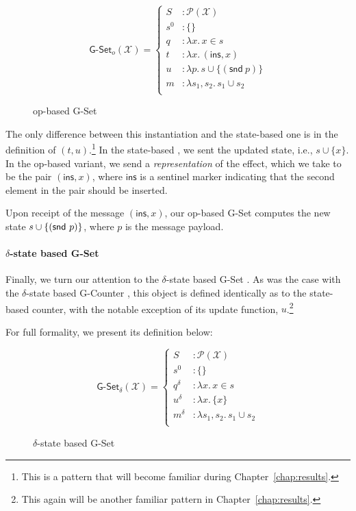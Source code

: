 \begin{figure}[H]
  \centering
  \[
    \textsf{G-Set}_o(\mathcal{X}) = \left\{\begin{aligned}
      S &: \mathcal{P}(\mathcal{X}) \\
      s^0 &: \{ \} \\
      q &: \lambda x.\, x \in s \\
      t &: \lambda x.\, (\textsf{ins}, x) \\
      u &: \lambda p.\, s \cup \{(\textsf{snd}~p)\} \\
      m &: \lambda s_1, s_2.\, s_1 \cup s_2 \\
    \end{aligned}\right.
  \]
  \caption{op-based \textsf{G-Set} \CRDT}
\end{figure}

The only difference between this \CRDT instantiation and the state-based one is
in the definition of $(t,u)$.\footnote{This is a pattern that will become
familiar during Chapter~\ref{chap:results}.} In the state-based \CRDT, we sent
the updated state, i.e., $s \cup \{ x \}$. In the op-based variant, we send a
\emph{representation} of the effect, which we take to be the pair
$(\textsf{ins}, x)$, where $\textsf{ins}$ is a sentinel marker indicating that
the second element in the pair should be inserted.

Upon receipt of the message $(\textsf{ins}, x)$, our op-based G-Set \CRDT
computes the new state $s \cup \{ (\textsf{snd}~p) \}$, where $p$ is the message
payload.

\paragraph{$\delta$-state based G-Set}
Finally, we turn our attention to the $\delta$-state based G-Set \CRDT. As was
the case with the $\delta$-state based G-Counter \CRDT, this object is defined
identically as to the state-based counter, with the notable exception of its
update function, $u$.\footnote{This again will be another familiar pattern in
Chapter~\ref{chap:results}.}

For full formality, we present its definition below:

\begin{figure}[H]
  \centering
  \[
    \textsf{G-Set}_\delta(\mathcal{X}) = \left\{\begin{aligned}
      S &: \mathcal{P}(\mathcal{X}) \\
      s^0 &: \{ \} \\
      q^\delta &: \lambda x.\, x \in s \\
      u^\delta &: \lambda x.\, \{ x \} \\
      m^\delta &: \lambda s_1, s_2.\, s_1 \cup s_2 \\
    \end{aligned}\right.
  \]
  \caption{$\delta$-state based \textsf{G-Set} \CRDT}
\end{figure}

